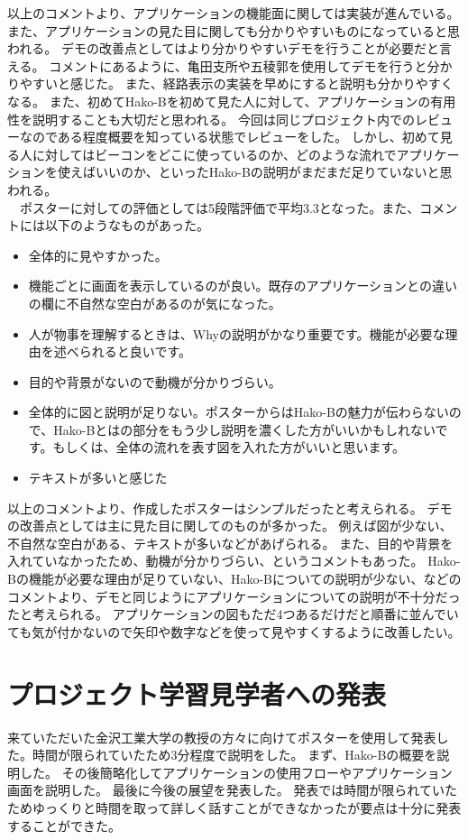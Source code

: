 \documentclass[openany,11pt,papersize]{jsbook}
\begin{document}
以上のコメントより、アプリケーションの機能面に関しては実装が進んでいる。
また、アプリケーションの見た目に関しても分かりやすいものになっていると思われる。
デモの改善点としてはより分かりやすいデモを行うことが必要だと言える。
コメントにあるように、亀田支所や五稜郭を使用してデモを行うと分かりやすいと感じた。
また、経路表示の実装を早めにすると説明も分かりやすくなる。
また、初めてHako-Bを初めて見た人に対して、アプリケーションの有用性を説明することも大切だと思われる。
今回は同じプロジェクト内でのレビューなのである程度概要を知っている状態でレビューをした。
しかし、初めて見る人に対してはビーコンをどこに使っているのか、どのような流れでアプリケーションを使えばいいのか、といったHako-Bの説明がまだまだ足りていないと思われる。\\
　ポスターに対しての評価としては5段階評価で平均3.3となった。また、コメントには以下のようなものがあった。
\begin{itemize}

\item 全体的に見やすかった。
\item 機能ごとに画面を表示しているのが良い。既存のアプリケーションとの違いの欄に不自然な空白があるのが気になった。
\item 人が物事を理解するときは、Whyの説明がかなり重要です。機能が必要な理由を述べられると良いです。
\item 目的や背景がないので動機が分かりづらい。
\item 全体的に図と説明が足りない。ポスターからはHako-Bの魅力が伝わらないので、Hako-Bとはの部分をもう少し説明を濃くした方がいいかもしれないです。もしくは、全体の流れを表す図を入れた方がいいと思います。
\item テキストが多いと感じた

\end{itemize}
以上のコメントより、作成したポスターはシンプルだったと考えられる。
デモの改善点としては主に見た目に関してのものが多かった。
例えば図が少ない、不自然な空白がある、テキストが多いなどがあげられる。
また、目的や背景を入れていなかったため、動機が分かりづらい、というコメントもあった。
Hako-Bの機能が必要な理由が足りていない、Hako-Bについての説明が少ない、などのコメントより、デモと同じようにアプリケーションについての説明が不十分だったと考えられる。
アプリケーションの図もただ4つあるだけだと順番に並んでいても気が付かないので矢印や数字などを使って見やすくするように改善したい。


\section{プロジェクト学習見学者への発表}
来ていただいた金沢工業大学の教授の方々に向けてポスターを使用して発表した。時間が限られていたため3分程度で説明をした。
まず、Hako-Bの概要を説明した。
その後簡略化してアプリケーションの使用フローやアプリケーション画面を説明した。
最後に今後の展望を発表した。
発表では時間が限られていたためゆっくりと時間を取って詳しく話すことができなかったが要点は十分に発表することができた。
\end{document}
